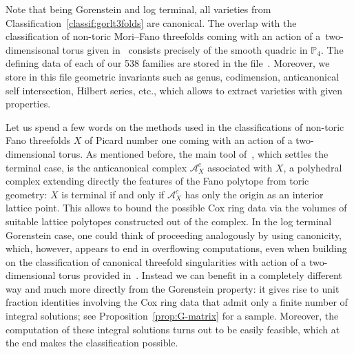 \documentclass[pdftex]{sigma}%
\theoremstyle{definition}
\def\PP{{\mathbb P}}
\numberwithin{equation}{section}
\begin{document}
Note that being Gorenstein and log terminal,
all varieties from
Classification~\ref{classif:gorlt3folds}
are canonical.
The overlap with the classification of
non-toric Mori--Fano threefolds coming with
an action of a~two-dimensisonal torus given
in~\cite{BeHaHuNi} consists
precisely of the smooth quadric in $\PP_4$.
The defining data of each of our 538
families are stored in the file~\cite{BaHa}.
Moreover, we store in this file geometric
invariants such as genus, codimension,
anticanonical self intersection, Hilbert series,
etc., which allows to extract varieties with
given properties.

Let us spend a few words on the methods used
in the classifications of non-toric Fano threefolds
$X$ of Picard number one coming with an action of
a two-dimensional torus.
As mentioned before, the main tool of~\cite{BeHaHuNi},
which settles the terminal case, is the
anticanonical complex $\mathcal{A}_X^c$
associated with $X$, a polyhedral complex
extending directly the features of the Fano
polytope from toric geometry: $X$ is
terminal if and only if $\mathcal{A}_X^c$
has only the origin as an interior lattice
point. This allows to bound the possible
Cox ring data via the volumes of
suitable lattice polytopes constructed
out of the complex.
In the log terminal Gorenstein case, one
could think of proceeding analogously by
using canonicity, which, however, appears
to end in overflowing computations, even
when building on the classification of
canonical threefold singularities with
action of a two-dimensional torus provided
in~\cite{BrHae}.
Instead we can benefit in a completely
different way and much more directly from
the Gorenstein property: it gives rise to
unit fraction identities involving
the Cox ring data that admit only
a finite number of integral solutions; see
Proposition~\ref{prop:G-matrix} for a sample.
Moreover, the computation of these integral
solutions turns out to be easily feasible,
which at the end makes the classification
possible.
\end{document}
